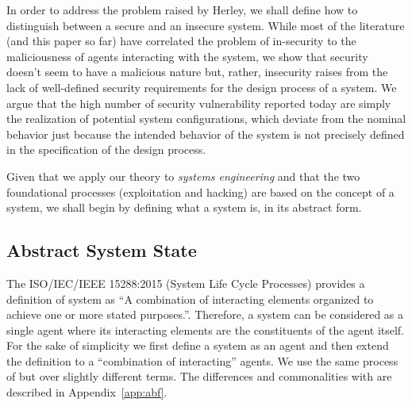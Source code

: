 In order to address the problem raised by Herley, 
we shall define how to distinguish between a secure and an insecure system.
While most of the literature (and this paper so far) have
correlated the problem of in-security to the maliciousness of
agents interacting with the system, we show that security
doesn't seem to have a malicious nature but, rather, insecurity 
raises from the lack of well-defined security requirements for the
design process of a system. We argue that the high number
of security vulnerability reported today are simply the realization
of potential system configurations, which deviate from the nominal
behavior just because the intended behavior of the system is not precisely 
defined in the specification of the design process. 

Given that we apply our theory to \emph{systems engineering} and that
the two foundational processes (exploitation and hacking) are based on the
concept of a system, we shall begin by defining what a system is, in its
abstract form.

\subsection{Abstract System State}\label{sec:systemstate}
The ISO/IEC/IEEE 15288:2015 (System Life Cycle Processes) provides a definition
of system as ``A combination of interacting elements organized to achieve one
or more stated purposes.''\autocite{ISO201515288}.  Therefore, a system can be
considered as a single agent where its interacting elements are the
constituents of the agent itself. For the sake of simplicity we first define a
system as an agent and then extend the definition to a ``combination of
interacting'' agents.  We use the same process of \autocite{Santaca2016abf} but
over slightly different terms. The differences and commonalities with
\autocite{Santaca2016abf} are described in Appendix~\ref{app:abf}. 

